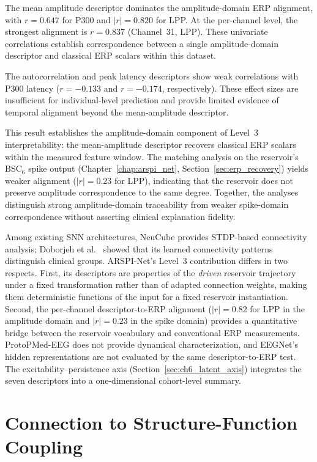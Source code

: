 The mean amplitude descriptor dominates the amplitude-domain ERP alignment, with $r = 0.647$ for P300 and $|r| = 0.820$ for LPP. At the per-channel level, the strongest alignment is $r = 0.837$ (Channel~31, LPP). These univariate correlations establish correspondence between a single amplitude-domain descriptor and classical ERP scalars within this dataset.

The autocorrelation and peak latency descriptors show weak correlations with P300 latency ($r = -0.133$ and $r = -0.174$, respectively). These effect sizes are insufficient for individual-level prediction and provide limited evidence of temporal alignment beyond the mean-amplitude descriptor.

This result establishes the amplitude-domain component of Level~3 interpretability: the mean-amplitude descriptor recovers classical ERP scalars within the measured feature window. The matching analysis on the reservoir's BSC$_6$ spike output (Chapter~\ref{chap:arspi_net}, Section~\ref{sec:erp_recovery}) yields weaker alignment ($|r| = 0.23$ for LPP), indicating that the reservoir does not preserve amplitude correspondence to the same degree. Together, the analyses distinguish strong amplitude-domain traceability from weaker spike-domain correspondence without asserting clinical explanation fidelity.

Among existing SNN architectures, NeuCube \cite{kasabov_neucube_2014} provides STDP-based connectivity analysis; Doborjeh et al.\ \cite{doborjeh_explainable_2021} showed that its learned connectivity patterns distinguish clinical groups. ARSPI-Net's Level~3 contribution differs in two respects. First, its descriptors are properties of the \emph{driven} reservoir trajectory under a fixed transformation rather than of adapted connection weights, making them deterministic functions of the input for a fixed reservoir instantiation. Second, the per-channel descriptor-to-ERP alignment ($|r| = 0.82$ for LPP in the amplitude domain and $|r| = 0.23$ in the spike domain) provides a quantitative bridge between the reservoir vocabulary and conventional ERP measurements. ProtoPMed-EEG \cite{barnett_protopmed_2024} does not provide dynamical characterization, and EEGNet's hidden representations are not evaluated by the same descriptor-to-ERP test. The excitability--persistence axis (Section~\ref{sec:ch6_latent_axis}) integrates the seven descriptors into a one-dimensional cohort-level summary.


\section{Connection to Structure-Function Coupling}
\label{sec:ch6_bridge}


